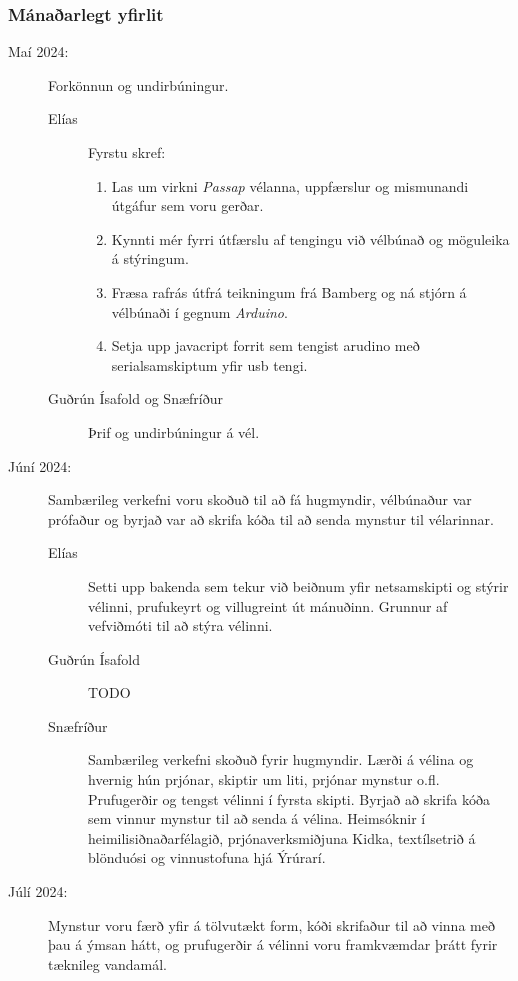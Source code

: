 \documentclass[a4paper,12pt,twoside]{article}
\begin{document}
\subsubsection{Mánaðarlegt yfirlit}
\begin{description}
    \item[Maí 2024:] Forkönnun og undirbúningur.  
    \begin{description}
        \item[Elías] Fyrstu skref:
        \begin{enumerate}
            \item Las um virkni \textit{Passap} vélanna, uppfærslur og mismunandi útgáfur sem voru gerðar.
            \item Kynnti mér fyrri útfærslu af tengingu við vélbúnað og möguleika á stýringum.
            \item Fræsa rafrás útfrá teikningum frá Bamberg \cite{bamberg} og ná stjórn á vélbúnaði í gegnum \textit{Arduino}.
            \item Setja upp javacript forrit sem tengist arudino með serialsamskiptum yfir usb tengi.
        \end{enumerate}
        \item[Guðrún Ísafold og Snæfríður] Þrif og undirbúningur á vél.
    \end{description}
    \item[Júní 2024:] Sambærileg verkefni voru skoðuð til að fá hugmyndir, vélbúnaður var prófaður og byrjað var að skrifa kóða til að senda mynstur til vélarinnar.
    \begin{description}
        \item[Elías] Setti upp bakenda sem tekur við beiðnum yfir netsamskipti og stýrir vélinni, prufukeyrt og villugreint út mánuðinn. Grunnur af vefviðmóti til að stýra vélinni.
        \item[Guðrún Ísafold] TODO
        \item[Snæfríður] Sambærileg verkefni skoðuð fyrir hugmyndir. Lærði á vélina og hvernig hún prjónar, skiptir um liti, prjónar mynstur o.fl. Prufugerðir og tengst vélinni í fyrsta skipti. Byrjað að skrifa kóða sem vinnur mynstur til að senda á vélina. Heimsóknir í heimilisiðnaðarfélagið, prjónaverksmiðjuna Kidka, textílsetrið á blönduósi og vinnustofuna hjá Ýrúrarí.
    \end{description}
    \item[Júlí 2024:]  Mynstur voru færð yfir á tölvutækt form, kóði skrifaður til að vinna með þau á ýmsan hátt, og prufugerðir á vélinni voru framkvæmdar þrátt fyrir tæknileg vandamál.

\end{description}
\end{document}
